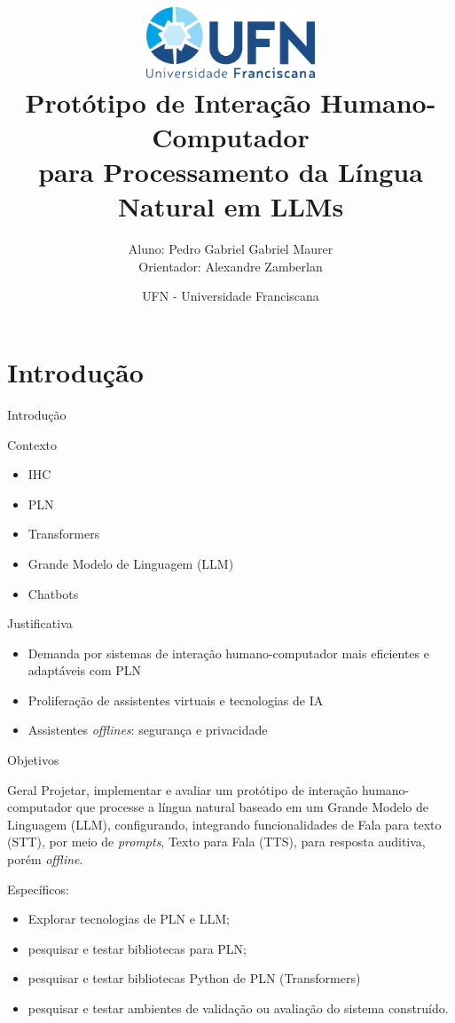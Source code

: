 \documentclass{beamer}
\title[TFG Ciência da Computação]{\includegraphics[height=2.1cm]{images/logoUFN.png}\\Protótipo de Interação Humano-Computador\\ para Processamento da Língua Natural em LLMs}
\author{Aluno: Pedro Gabriel Gabriel Maurer              \\              Orientador: Alexandre Zamberlan}
\date{UFN - Universidade Franciscana}
\begin{document}
 

\begin{frame}
  \titlepage
\end{frame}

\section{Introdução}  
\begin{frame}[allowframebreaks]{Introdução}
    \begin{block}{Contexto}
        \begin{itemize}
            \item IHC
            \item PLN
            \item Transformers
            \item Grande Modelo de Linguagem (LLM)
            \item Chatbots
        \end{itemize}
    \end{block}
\end{frame}

\begin{frame}{Justificativa}
    \begin{block}{}
    \begin{itemize}
        \item Demanda por sistemas de interação humano-computador mais eficientes e adaptáveis com PLN
        \item Proliferação de assistentes virtuais e tecnologias de IA
        \item Assistentes \textit{offlines}: segurança e privacidade
    \end{itemize}
    \end{block}
\end{frame}  
 
\begin{frame}[allowframebreaks]{Objetivos}
    \begin{block}{Geral}
      Projetar, implementar e avaliar um protótipo de interação humano-computador que processe a língua natural baseado em um Grande Modelo de Linguagem (LLM), configurando, integrando funcionalidades de Fala para texto (STT), por meio de \textit{prompts}, Texto para Fala (TTS), para resposta auditiva, porém  \textit{offline}.
    \end{block}
    
    Específicos:
   \begin{itemize}
        \item Explorar tecnologias de PLN e LLM; %
        \item pesquisar e testar bibliotecas para PLN;
        \item pesquisar e testar bibliotecas Python de PLN (Transformers)
        \item pesquisar e testar ambientes de validação ou avaliação do sistema construído.
    \end{itemize}
\end{frame}
\end{document}
